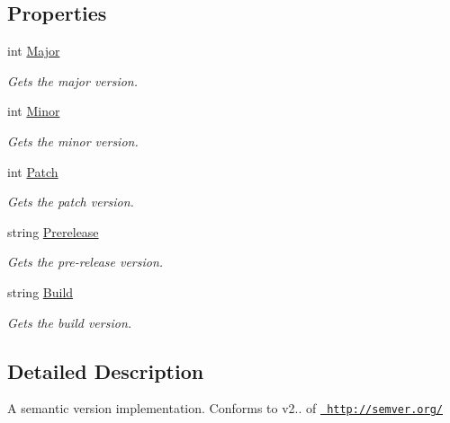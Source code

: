 \subsection*{Properties}
\begin{DoxyCompactItemize}
\item 
int \mbox{\hyperlink{class_semver_1_1_sem_version_a11294c417e3952d0429cbc7e398d0d49}{Major}}
\begin{DoxyCompactList}\small\item\em Gets the major version. \end{DoxyCompactList}\item 
int \mbox{\hyperlink{class_semver_1_1_sem_version_a74229ba692723ce4079715c3cff26413}{Minor}}
\begin{DoxyCompactList}\small\item\em Gets the minor version. \end{DoxyCompactList}\item 
int \mbox{\hyperlink{class_semver_1_1_sem_version_a03f77dd74e47eefff519ba00cd43db9a}{Patch}}
\begin{DoxyCompactList}\small\item\em Gets the patch version. \end{DoxyCompactList}\item 
string \mbox{\hyperlink{class_semver_1_1_sem_version_a8bb1554a68d74cef681af7cc01d460ef}{Prerelease}}
\begin{DoxyCompactList}\small\item\em Gets the pre-\/release version. \end{DoxyCompactList}\item 
string \mbox{\hyperlink{class_semver_1_1_sem_version_a665a136e947cb428968ebe21579ac0cf}{Build}}
\begin{DoxyCompactList}\small\item\em Gets the build version. \end{DoxyCompactList}\end{DoxyCompactItemize}


\subsection{Detailed Description}
A semantic version implementation. Conforms to v2.. of \href{http://semver.org/}{\texttt{ http\+://semver.\+org/}} 



